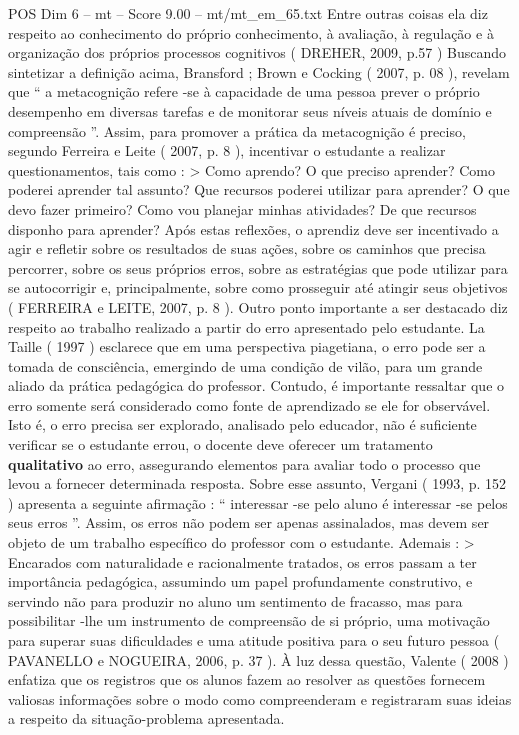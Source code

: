 \begin{textsample}{POS Dim 6 – mt – Score 9.00 – mt/mt\_em\_65.txt}
Entre outras coisas ela diz respeito ao conhecimento do próprio conhecimento, à avaliação, à regulação e à organização dos próprios processos cognitivos ( DREHER, 2009, p.57 ) Buscando sintetizar a definição acima, Bransford ; Brown e Cocking ( 2007, p. 08 ), revelam que “ a metacognição refere -se à capacidade de uma pessoa prever o próprio desempenho em diversas tarefas e de monitorar seus níveis atuais de domínio e compreensão ”.
Assim, para promover a prática da metacognição é preciso, segundo Ferreira e Leite ( 2007, p. 8 ), incentivar o estudante a realizar questionamentos, tais como : > Como aprendo?
O que preciso aprender?
Como poderei aprender tal assunto?
Que recursos poderei utilizar para aprender?
O que devo fazer primeiro?
Como vou planejar minhas atividades?
De que recursos disponho para aprender?
Após estas reflexões, o aprendiz deve ser incentivado a agir e refletir sobre os resultados de suas ações, sobre os caminhos que precisa percorrer, sobre os seus próprios erros, sobre as estratégias que pode utilizar para se autocorrigir e, principalmente, sobre como prosseguir até atingir seus objetivos ( FERREIRA e LEITE, 2007, p. 8 ).
Outro ponto importante a ser destacado diz respeito ao trabalho realizado a partir do erro apresentado pelo estudante.
La Taille ( 1997 ) esclarece que em uma perspectiva piagetiana, o erro pode ser a tomada de consciência, emergindo de uma condição de vilão, para um grande aliado da prática pedagógica do professor.
Contudo, é importante ressaltar que o erro somente será considerado como fonte de aprendizado se ele for observável.
Isto é, o erro precisa ser explorado, analisado pelo educador, não é suficiente verificar se o estudante errou, o docente deve oferecer um tratamento \textbf{qualitativo} ao erro, assegurando elementos para avaliar todo o processo que levou a fornecer determinada resposta.
Sobre esse assunto, Vergani ( 1993, p. 152 ) apresenta a seguinte afirmação : “ interessar -se pelo aluno é interessar -se pelos seus erros ”.
Assim, os erros não podem ser apenas assinalados, mas devem ser objeto de um trabalho específico do professor com o estudante.
Ademais : > Encarados com naturalidade e racionalmente tratados, os erros passam a ter importância pedagógica, assumindo um papel profundamente construtivo, e servindo não para produzir no aluno um sentimento de fracasso, mas para possibilitar -lhe um instrumento de compreensão de si próprio, uma motivação para superar suas dificuldades e uma atitude positiva para o seu futuro pessoa ( PAVANELLO e NOGUEIRA, 2006, p. 37 ).
À luz dessa questão, Valente ( 2008 ) enfatiza que os registros que os alunos fazem ao resolver as questões fornecem valiosas informações sobre o modo como compreenderam e registraram suas ideias a respeito da situação-problema apresentada.

\end{textsample}
